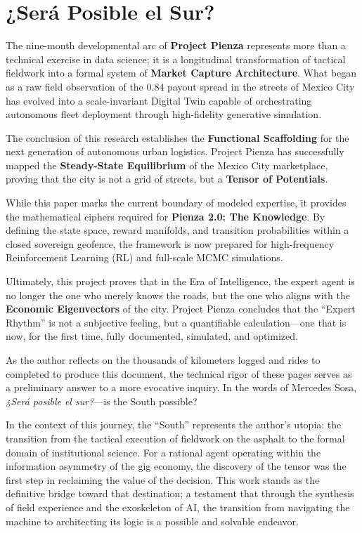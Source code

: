 \section{¿Será Posible el Sur?}

The nine-month developmental arc of \textbf{Project Pienza} represents more than a technical exercise in data science; it is a longitudinal transformation of tactical fieldwork into a formal system of \textbf{Market Capture Architecture}. What began as a raw field observation of the $0.84$ payout spread in the streets of Mexico City has evolved into a scale-invariant Digital Twin capable of orchestrating autonomous fleet deployment through high-fidelity generative simulation.

The conclusion of this research establishes the \textbf{Functional Scaffolding} for the next generation of autonomous urban logistics. Project Pienza has successfully mapped the \textbf{Steady-State Equilibrium} of the Mexico City marketplace, proving that the city is not a grid of streets, but a \textbf{Tensor of Potentials}. 

While this paper marks the current boundary of modeled expertise, it provides the mathematical ciphers required for \textbf{Pienza 2.0: The Knowledge}. By defining the state space, reward manifolds, and transition probabilities within a closed sovereign geofence, the framework is now prepared for high-frequency Reinforcement Learning (RL) and full-scale MCMC simulations. 

Ultimately, this project proves that in the Era of Intelligence, the expert agent is no longer the one who merely knows the roads, but the one who aligns with the \textbf{Economic Eigenvectors} of the city. Project Pienza concludes that the ``Expert Rhythm'' is not a subjective feeling, but a quantifiable calculation---one that is now, for the first time, fully documented, simulated, and optimized.


As the author reflects on the thousands of kilometers logged and rides to completed to produce this document, the technical rigor of these pages serves as a preliminary answer to a more evocative inquiry. In the words of Mercedes Sosa, \textit{¿Será posible el sur?}---is the South possible? 

In the context of this journey, the ``South'' represents the author's utopia: the transition from the tactical execution of fieldwork on the asphalt to the formal domain of institutional science. For a rational agent operating within the information asymmetry of the gig economy, the discovery of the tensor was the first step in reclaiming the value of the decision. This work stands as the definitive bridge toward that destination; a testament that through the synthesis of field experience and the exoskeleton of AI, the transition from navigating the machine to architecting its logic is a possible and solvable endeavor.

